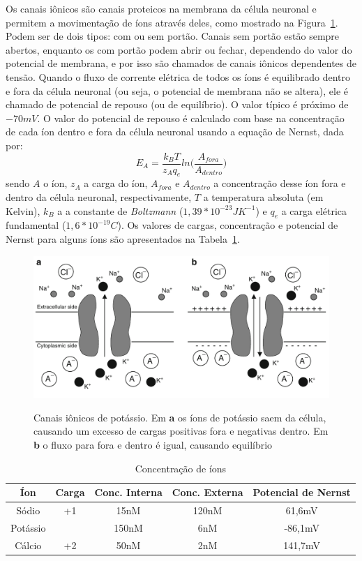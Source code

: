 Os canais iônicos são canais proteicos na membrana da célula neuronal e permitem a movimentação de íons através deles, como mostrado na Figura~\ref{fig:canaisions}. Podem ser de dois tipos: com ou sem portão. Canais sem portão estão sempre abertos, enquanto os com portão podem abrir ou fechar, dependendo do valor do potencial de membrana, e por isso são chamados de canais iônicos dependentes de tensão. Quando o fluxo de corrente elétrica de todos os íons é equilibrado dentro e fora da célula neuronal (ou seja, o potencial de membrana não se altera), ele é chamado de potencial de repouso (ou de equilíbrio). O valor típico é próximo de $-70mV$. O valor do potencial de repouso é calculado com base na concentração de cada íon dentro e fora da célula neuronal usando a equação de Nernst, dada por:
$$
E_A=\frac{k_BT}{z_Aq_e}ln\Big(\frac{A_{fora}}{A_{dentro}}\Big)
$$
sendo $A$ o íon, $z_A$ a carga do íon, $A_{fora}$ e $A_{dentro}$ a concentração desse íon fora e dentro da célula neuronal, respectivamente, $T$ a temperatura absoluta (em Kelvin), $k_B$ a a constante de \textit{Boltzmann} ($1,39*10^{-23}JK^{-1}$) e $q_e$ a carga elétrica fundamental ($1,6*10^{-19}C$). Os valores de cargas, concentração e potencial de Nernst para alguns íons são apresentados na Tabela~\ref{tab:concentracao_nernst}.

\begin{figure}[htb!]
	\centering
	\caption[Canais iônicos de potássio]{Canais iônicos de potássio. Em \textbf{a} os íons de potássio saem da célula, causando um excesso de cargas positivas fora e negativas dentro. Em \textbf{b} o fluxo para fora e dentro é igual, causando equilíbrio}
	\label{fig:canaisions}
	\includegraphics[width=0.7\linewidth]{figs/canais_ions}
	\\
	\cite{ermentrout_mathematical_2010}
\end{figure}

\begin{table}
	\centering
	\caption[Concentração de íons]{Concentração de íons}
	\label{tab:concentracao_nernst}
	\begin{tabular}{c|c|c|c|c}
		\hline
		Íon & Carga & Conc. Interna & Conc. Externa & Potencial de Nernst \\
		\hline
		Sódio & +1 & 15nM & 120nM & 61,6mV \\
		\hline
		Potássio &  & 150nM & 6nM & -86,1mV \\
		\hline
		Cálcio & +2 & 50nM & 2nM & 141,7mV \\
		\hline
	\end{tabular}
\end{table}


